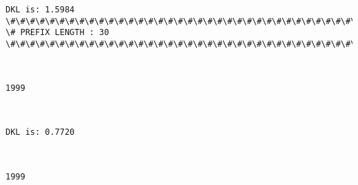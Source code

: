 \documentclass[11pt]{article}
\begin{document}
    \begin{Verbatim}[commandchars=\\\{\}]
DKL is: 1.5984
\#\#\#\#\#\#\#\#\#\#\#\#\#\#\#\#\#\#\#\#\#\#\#\#\#\#\#\#\#\#\#\#\#\#\#\#\#\#\#\#\#\#\#\#\#\#\#\#\#\#\#\#\#\#\#\#\#\#\#\#\#\#\#\#\#\#\#\#\#\#\#\#\#\#\#\#
\# PREFIX LENGTH : 30
\#\#\#\#\#\#\#\#\#\#\#\#\#\#\#\#\#\#\#\#\#\#\#\#\#\#\#\#\#\#\#\#\#\#\#\#\#\#\#\#\#\#\#\#\#\#\#\#\#\#\#\#\#\#\#\#\#\#\#\#\#\#\#\#\#\#\#\#\#\#\#\#\#\#\#\#

    \end{Verbatim}

    \begin{center}
    \end{center}
    { \hspace*{\fill} \\}
    
    \begin{Verbatim}[commandchars=\\\{\}]
1999

    \end{Verbatim}

    \begin{center}
    \end{center}
    { \hspace*{\fill} \\}
    
    \begin{Verbatim}[commandchars=\\\{\}]
DKL is: 0.7720

    \end{Verbatim}

    \begin{center}
    \end{center}
    { \hspace*{\fill} \\}
    
    \begin{Verbatim}[commandchars=\\\{\}]
1999

    \end{Verbatim}

    \begin{center}
    \end{center}
    { \hspace*{\fill} \\}
    
\end{document}
